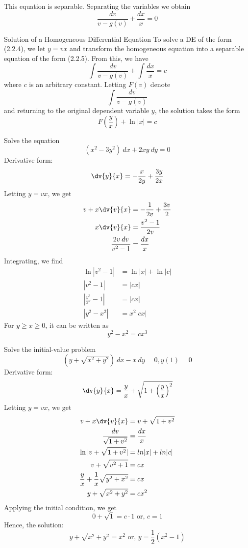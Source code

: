 This equation is separable. Separating the variables we obtain
\begin{equation}
    \frac{d{v}}{v - g(v)} + \frac{d{x}}{x} = 0
\end{equation}

\begin{theorem}{Solution of a Homogeneous Differential Equation}{}
    To solve a DE of the form (2.2.4), we let $y = vx$ and transform the homogeneous equation into a separable equation of the form (2.2.5). From this, we have \[
        \int{\frac{dv}{v - g(v)}} + \int{\frac{dx}{x}} = c
    \] where $c$ is an arbitrary constant. Letting $F(v)$ denote \[
        \int{\frac{dv}{v - g(v)}}
    \] and returning to the original dependent variable $y$, the solution takes the form \[
        F\left( \frac{y}{x} \right) + \ln|x| = c
    \]
\end{theorem}

\begin{example}{Solve the equation \[
        (x^2 - 3y^2) \: d{x} + 2xy \: d{y} = 0
\]}{}
    Derivative form: \[
        \dv{y}{x} = - \frac{x}{2y} + \frac{3y}{2x}
    \] Letting $y = vx$, we get
    \begin{align*}
        v + x\dv{v}{x} &= -\frac{1}{2v} + \frac{3v}{2} \\
        x\dv{v}{x} &= \frac{v^2-1}{2v} \\
        \frac{2v \: dv}{v^2-1} &= \frac{dx}{x}
    \end{align*}
    Integrating, we find
    \begin{align*}
        \ln|v^2 - 1| &= \ln|x| + \ln|c| \\
        |v^2 - 1| &= |cx| \\
        |\frac{y^2}{x^2} - 1| &= |cx| \\
        |y^2 - x^2| &= x^2|cx|
    \end{align*}
    For $y \ge x \ge 0$, it can be written as \[
        \boxed{y^2 - x^2 = cx^3}
    \]
\end{example}

\begin{example}{Solve the initial-value problem \[
        (y + \sqrt{x^2 + y^2}) \: d{x} - x \: d{y} = 0, y(1) = 0
\]}{}
    Derivative form: \[
        \dv{y}{x} = \frac{y}{x} + \sqrt{1 + \left( \frac{y}{x} \right)^2}
    \] Letting $y = vx$, we get
    \begin{align*}
        v + x\dv{v}{x} &= v + \sqrt{1 + v^2} \\
        \frac{dv}{\sqrt{1+v^2}} &= \frac{dx}{x} \\
        \ln|v + \sqrt{1+v^2}| &= ln|x|+ln|c| \\
        v + \sqrt{v^2 + 1} &= cx \\
        \frac{y}{x} + \frac{1}{x}\sqrt{y^2 + x^2} &= cx \\
        y + \sqrt{x^2 + y^2} &=  cx^2 \\
    \end{align*}
    Applying the initial condition, we get \[
        0 + \sqrt{1} = c \cdot 1 \text{ or, } c = 1
    \] Hence, the solution: \[
        \boxed{ y + \sqrt{x^2 + y^2} = x^2 } \text{ or, } \boxed{y = \frac{1}{2}(x^2 - 1)}
    \]
\end{example}

